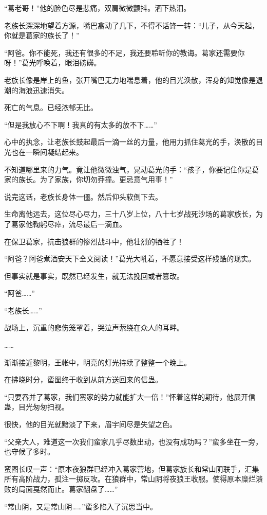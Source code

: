 \begin{this_body}
“葛老哥！”他的脸色尽是悲痛，双肩微微颤抖。洒下热泪。

老族长深深地望着方源，嘴巴翕动了几下，不得不话锋一转：“儿子，从今天起，你就是葛家的族长了！”

“阿爸。你不能死，我还有很多的不足，我还要聆听你的教诲。葛家还需要你呀！”葛光呼唤着，眼泪磅礴。

老族长像是岸上的鱼，张开嘴巴无力地喘息着，他的目光涣散，浑身的知觉像是退潮的海浪迅速消失。

死亡的气息。已经浓郁无比。

“但是我放心不下啊！我真的有太多的放不下……”

心中的执念，让老族长鼓起最后一滴一丝的力量，他用力抓住葛光的手，涣散的目光也在一瞬间凝结起来。

不知道哪里来的力气。竟让他微微浊气，晃动葛光的手：“孩子，你要记住你是葛家的族长。为了家族，你切勿莽撞。更忌意气用事！”

说完这话，老族长身体一僵。然后仰头软倒下去。

生命离他远去，这位尽心尽力，三十八岁上位，八十七岁战死沙场的葛家族长，为了葛家他鞠躬尽瘁，流尽最后一滴血。

在保卫葛家，抗击狼群的惨烈战斗中，他壮烈的牺牲了！

“阿爸？阿爸煮酒安天下全文阅读！”葛光大吼着，不愿意接受这样残酷的现实。

但事实就是事实，既然已经发生，就无法挽回或者篡改。

“阿爸……”

“老族长……”

战场上，沉重的悲伤笼罩着，哭泣声萦绕在众人的耳畔。

……

渐渐接近黎明，王帐中，明亮的灯光持续了整整一个晚上。

在拂晓时分，蛮图终于收到从前方送回来的信蛊。

“只要吞并了葛家，我们蛮家的势力就能扩大一倍！”怀着这样的期待，他展开信蛊，目光匆匆扫视。

很快，他的目光就黯淡了下来，眉宇间尽是失望之色。

“父亲大人，难道这一次我们蛮家几乎尽数出动，也没有成功吗？”蛮多坐在一旁，也守候了多时。

蛮图长叹一声：“原本夜狼群已经冲入葛家营地，但葛家族长和常山阴联手，汇集所有高阶战力，孤注一掷反攻。在狼群中，常山阴将夜狼王收服。使得原本糜烂溃败的局面戛然而止。葛家翻盘了……”

“常山阴，又是常山阴……”蛮多陷入了沉思当中。


\end{this_body}

